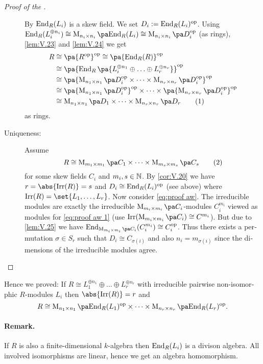 \documentclass[12pt,a4paper]{scrartcl}
\theoremstyle{cplain}
\theoremstyle{cplain}
\theoremstyle{cplain}
\theoremstyle{definition}
\begin{document}
\begin{otherlanguage}{english}
\begin{proof}[Proof of the ]
\begin{description}
    By  $\operatorname{End}_R(L_i)$ is a skew field. We set $D_i := \operatorname{End}_R(L_i)^{\operatorname{op}}$. Using $\End_R (L_i^{\oplus n_i}) \cong \Mat{n_i}{\End_R(L_i)} \cong \Mat{n_i}{D_i^{\op}}$ (as rings), \cref{lem:V.23} and \cref{lem:V.24} we get
    \begin{align*}
      R & \cong \pa{R^{\op}}^{\op} \cong \pa{\End_R(R)}^{\op} \\
      &\cong \pa{\End_R\pa{L_i^{\oplus n_1}\oplus \ldots \oplus L_r^{\oplus n_r}}}^{\op} \\
      &\cong \pa{\Mat {n_1}{D_i^{\op}}\times \cdots \times \Mat {n_r}{D_i^{\op}}}^{\op} \\
      &\cong \pa{\Mat {n_1}{D_i^{\op}}}^{\op}\times \cdots \times \pa{\Mat {n_r}{D_i^{\op}}}^{\op} \\
      &\cong \Mat{n_1}{D_1}\times \cdots \times \Mat{n_r}{D_r} \tag{1} \label{eq:proof aw 1}
    \end{align*}
    as rings.
    \item[Uniqueness:] Assume \begin{equation}R\cong \Mat{m_1}{C_1}\times\cdots\times \Mat{m_s}{C_s}\tag{2}\label{eq:proof aw}\end{equation} for some skew fields $C_i$ and $m_i,s\in\mathbb N$. By \cref{cor:V.20} we have $r = \abs{\Irr(R)} = s$ and $D_i \cong \operatorname{End}_R(L_i)^{\operatorname{op}}$ (see above) where $\Irr(R) = \set{L_1,\ldots,L_r}$. Now consider \eqref{eq:proof aw}. The irreducible modules are exactly the irreducible $\Mat{m_i}{C_i}$-modules $C_i^{m_i}$ viewed as modules for \eqref{eq:proof aw 1} (use $\Irr(\Mat{m_i}{C_i}) \cong C^{m_i}$). But due to \cref{lem:V.25} we have $\End_{\Mat{m_i}{C_i}}(C_i^{m_i})\cong C_i^{\op}$. Thus there exists a permutation $\sigma\in S_r$ such that $D_i\cong C_{\sigma(i)}$ and also $n_i=m_{\sigma(i)}$ since the dimensions of the irreducible modules agree.
    \qedhere
  \end{description}
\end{proof}

Hence we proved: If $R\cong L_1^{\oplus n_1}\oplus \ldots \oplus L_r^{\oplus n_r}$ with irreducible pairwise non-isomorphic $R$-modules $L_i$ then $\abs{\Irr(R)} = r$ and \[ R \cong \Mat{n_1}{\End_R(L_1)^{\op}}\times\cdots\times \Mat{n_r}{\End_R(L_r)^{\op}}. \]

\paragraph{Remark.} If $R$ is also a finite-dimensional $k$-algebra then $\operatorname{End}_R(L_i)$ is a divison algebra. All involved isomorphisms are linear, hence we get an algebra homomorphism.


\end{otherlanguage}
\end{document}
